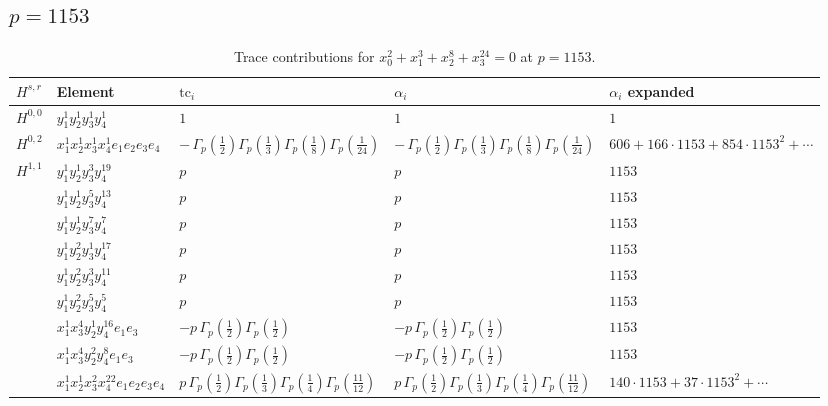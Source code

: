\documentclass[11pt]{article}
\begin{document}
\subsection*{$p = 1153$}

\begin{table}[ht]
\centering
\caption{Trace contributions for $x_0^{2} + x_1^{3} + x_2^{8} + x_3^{24} = 0$ at $p=1153$.}\label{tab:diagonal-3}
\renewcommand{\arraystretch}{1.1}
{\scriptsize
\begin{tabular}{@{}lllll@{}}
\toprule
$H^{s,r}$ & Element & $\mathrm{tc}_i$ & $\alpha_i$ & $\alpha_i$ expanded \\
\midrule
$H^{0,0}$ & $y_{1}^{1} y_{2}^{1} y_{3}^{1} y_{4}^{1}$ & $1$ & $1$ & $1$ \\
\midrule
$H^{0,2}$ & $x_{1}^{1} x_{2}^{1} x_{3}^{1} x_{4}^{1}  e_{1} e_{2} e_{3} e_{4}$ & $- \, \Gamma_p \left( \frac{1}{2} \right) \Gamma_p \left( \frac{1}{3} \right) \Gamma_p \left( \frac{1}{8} \right) \Gamma_p \left( \frac{1}{24} \right)$ & $- \, \Gamma_p \left( \frac{1}{2} \right) \Gamma_p \left( \frac{1}{3} \right) \Gamma_p \left( \frac{1}{8} \right) \Gamma_p \left( \frac{1}{24} \right)$ & $606{+}166{\cdot}1153{+}854{\cdot}1153^{2}{+}\cdots$ \\
\midrule
$H^{1,1}$ & $y_{1}^{1} y_{2}^{1} y_{3}^{3} y_{4}^{19}$ & $p \,$ & $p \,$ & $1153$ \\
 & $y_{1}^{1} y_{2}^{1} y_{3}^{5} y_{4}^{13}$ & $p \,$ & $p \,$ & $1153$ \\
 & $y_{1}^{1} y_{2}^{1} y_{3}^{7} y_{4}^{7}$ & $p \,$ & $p \,$ & $1153$ \\
 & $y_{1}^{1} y_{2}^{2} y_{3}^{1} y_{4}^{17}$ & $p \,$ & $p \,$ & $1153$ \\
 & $y_{1}^{1} y_{2}^{2} y_{3}^{3} y_{4}^{11}$ & $p \,$ & $p \,$ & $1153$ \\
 & $y_{1}^{1} y_{2}^{2} y_{3}^{5} y_{4}^{5}$ & $p \,$ & $p \,$ & $1153$ \\
 & $x_{1}^{1} x_{3}^{4} y_{2}^{1} y_{4}^{16} e_{1} e_{3}$ & $- p \, \Gamma_p \left( \frac{1}{2} \right) \Gamma_p \left( \frac{1}{2} \right)$ & $- p \, \Gamma_p \left( \frac{1}{2} \right) \Gamma_p \left( \frac{1}{2} \right)$ & $1153$ \\
 & $x_{1}^{1} x_{3}^{4} y_{2}^{2} y_{4}^{8} e_{1} e_{3}$ & $- p \, \Gamma_p \left( \frac{1}{2} \right) \Gamma_p \left( \frac{1}{2} \right)$ & $- p \, \Gamma_p \left( \frac{1}{2} \right) \Gamma_p \left( \frac{1}{2} \right)$ & $1153$ \\
 & $x_{1}^{1} x_{2}^{1} x_{3}^{2} x_{4}^{22}  e_{1} e_{2} e_{3} e_{4}$ & $p \, \Gamma_p \left( \frac{1}{2} \right) \Gamma_p \left( \frac{1}{3} \right) \Gamma_p \left( \frac{1}{4} \right) \Gamma_p \left( \frac{11}{12} \right)$ & $p \, \Gamma_p \left( \frac{1}{2} \right) \Gamma_p \left( \frac{1}{3} \right) \Gamma_p \left( \frac{1}{4} \right) \Gamma_p \left( \frac{11}{12} \right)$ & $140{\cdot}1153{+}37{\cdot}1153^{2}{+}\cdots$ \\

\end{tabular}}
\end{table}
\end{document}
